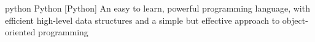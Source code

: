 \newglsXsoftware%
{python}%
{Python\textsuperscript{\texttrademark}}%
[Python]%
{An easy to learn, powerful programming language, with efficient high-level data structures and a simple but effective approach to object-oriented programming \cite{website:Python}}%